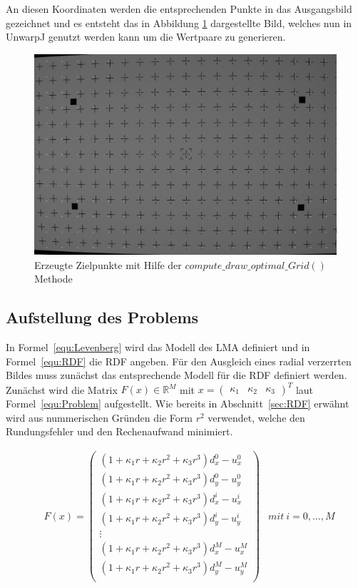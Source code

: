 An diesen Koordinaten werden die entsprechenden Punkte in das Ausgangsbild gezeichnet und es entsteht das in Abbildung \ref{fig:gitter-optimal} dargestellte Bild, welches nun in UnwarpJ genutzt werden kann um die Wertpaare zu generieren.

\begin{figure}[H]
\includegraphics[width=\textwidth]{Images/optimales-gitter.png}
\caption{Erzeugte Zielpunkte mit Hilfe der $compute\_draw\_optimal\_Grid()$ Methode}
\label{fig:gitter-optimal}
\end{figure}

\subsection{Aufstellung des Problems}
\label{sec:Problem}
In Formel~\ref{equ:Levenberg} wird das Modell des LMA definiert und in Formel~\ref{equ:RDF} die RDF angeben. 
Für den Ausgleich eines radial verzerrten Bildes muss zunächst das entsprechende Modell für die RDF definiert werden. Zunächst wird die Matrix $F(x) \in \mathbb{R}^M$ mit $x = \begin{pmatrix}
\kappa_1 & \kappa_2 & \kappa_3\end{pmatrix}^T$ laut Formel~\ref{equ:Problem} aufgestellt. Wie bereits in Abschnitt~\ref{sec:RDF} erwähnt wird aus nummerischen Gründen die Form $r^2$ verwendet, welche den Rundungsfehler und den Rechenaufwand minimiert. 

\begin{equation}
\label{equ:Problem}
\begin{aligned}
&F(x)=
\begin{pmatrix}
(1+\kappa_1 r + \kappa_2 r^2 + \kappa_3 r^3)d_x^0 -u_x^0\\
(1+\kappa_1 r + \kappa_2 r^2 + \kappa_3 r^3)d_y^0 -u_y^0\\
(1+\kappa_1 r + \kappa_2 r^2 + \kappa_3 r^3)d_x^i -u_x^i\\
(1+\kappa_1 r + \kappa_2 r^2 + \kappa_3 r^3)d_y^i -u_y^i\\
\vdots\\
(1+\kappa_1 r + \kappa_2 r^2 + \kappa_3 r^3)d_x^M -u_x^M\\
(1+\kappa_1 r + \kappa_2 r^2 + \kappa_3 r^3)d_y^M -u_y^M\\
\end{pmatrix}
&mit\ i = 0,\dots,M
\end{aligned}
\end{equation}

